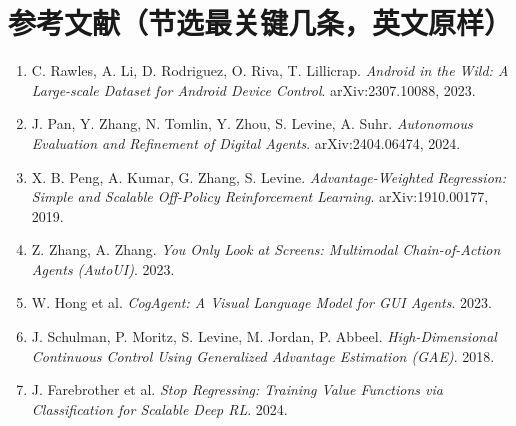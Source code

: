 \documentclass[11pt,UTF8,fontset=fandol]{ctexart}
\begin{document}
\section*{参考文献（节选最关键几条，英文原样）}
\begin{enumerate}[leftmargin=2em]
\item C. Rawles, A. Li, D. Rodriguez, O. Riva, T. Lillicrap. \textit{Android in the Wild: A Large-scale Dataset for Android Device Control}. arXiv:2307.10088, 2023.
\item J. Pan, Y. Zhang, N. Tomlin, Y. Zhou, S. Levine, A. Suhr. \textit{Autonomous Evaluation and Refinement of Digital Agents}. arXiv:2404.06474, 2024.
\item X. B. Peng, A. Kumar, G. Zhang, S. Levine. \textit{Advantage-Weighted Regression: Simple and Scalable Off-Policy Reinforcement Learning}. arXiv:1910.00177, 2019.
\item Z. Zhang, A. Zhang. \textit{You Only Look at Screens: Multimodal Chain-of-Action Agents (AutoUI)}. 2023.
\item W. Hong et al. \textit{CogAgent: A Visual Language Model for GUI Agents}. 2023.
\item J. Schulman, P. Moritz, S. Levine, M. Jordan, P. Abbeel. \textit{High-Dimensional Continuous Control Using Generalized Advantage Estimation (GAE)}. 2018.
\item J. Farebrother et al. \textit{Stop Regressing: Training Value Functions via Classification for Scalable Deep RL}. 2024.
\end{enumerate}
\end{document}
